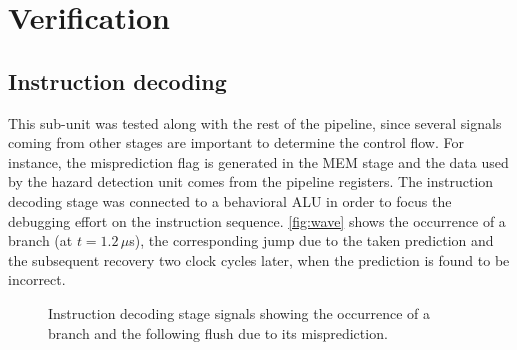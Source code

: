 \chapter{Verification}

\section{Instruction decoding}
This sub-unit was tested along with the rest of the pipeline, since several signals coming from other stages are important to determine the control flow. For instance, the misprediction flag is generated in the MEM stage and the data used by the hazard detection unit comes from the pipeline registers. The instruction decoding stage was connected to a behavioral ALU in order to focus the debugging effort on the instruction sequence. \autoref{fig:wave} shows the occurrence of a branch (at $t=1.2\, \mu$s), the corresponding jump due to the taken prediction and the subsequent recovery two clock cycles later, when the prediction is found to be incorrect.

\begin{figure}
	\caption{Instruction decoding stage signals showing the occurrence of a branch and the following flush due to its misprediction.}
	\label{fig:wave}
\end{figure}